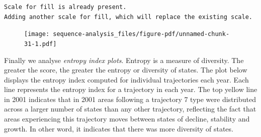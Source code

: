 \documentclass[
  letterpaper,
  DIV=11,
  numbers=noendperiod]{scrreprt}
\newenvironment{Shaded}{\begin{snugshade}}{\end{snugshade}}
\newcommand{\AttributeTok}[1]{\textcolor[rgb]{0.40,0.45,0.13}{#1}}
\newcommand{\CommentTok}[1]{\textcolor[rgb]{0.37,0.37,0.37}{#1}}
\newcommand{\DecValTok}[1]{\textcolor[rgb]{0.68,0.00,0.00}{#1}}
\newcommand{\FunctionTok}[1]{\textcolor[rgb]{0.28,0.35,0.67}{#1}}
\newcommand{\NormalTok}[1]{\textcolor[rgb]{0.00,0.23,0.31}{#1}}
\newcommand{\OtherTok}[1]{\textcolor[rgb]{0.00,0.23,0.31}{#1}}
\newcommand{\SpecialCharTok}[1]{\textcolor[rgb]{0.37,0.37,0.37}{#1}}
\newcommand{\StringTok}[1]{\textcolor[rgb]{0.13,0.47,0.30}{#1}}
\begin{document}
\begin{Shaded}
\end{Shaded}

\begin{verbatim}
Scale for fill is already present.
Adding another scale for fill, which will replace the existing scale.
\end{verbatim}

\begin{figure}[H]

{\centering \texttt{[image: sequence-analysis\_files/figure-pdf/unnamed-chunk-31-1.pdf]}

}

\end{figure}

Finally we analyse \emph{entropy index plots}. Entropy is a measure of
diversity. The greater the score, the greater the entropy or diversity
of states. The plot below displays the entropy index computed for
individual trajectories each year. Each line represents the entropy
index for a trajectory in each year. The top yellow line in 2001
indicates that in 2001 areas following a trajectory 7 type were
distributed across a larger number of states than any other trajectory,
reflecting the fact that areas experiencing this trajectory moves
between states of decline, stability and growth. In other word, it
indicates that there was more diversity of states.
\end{document}
